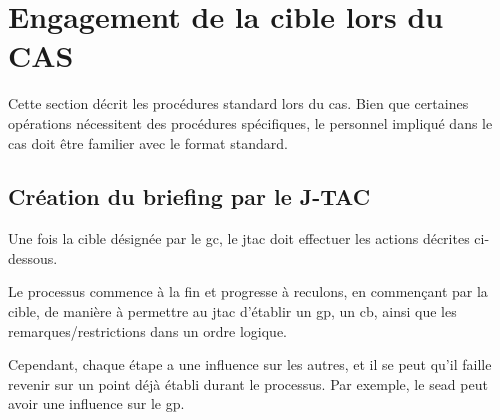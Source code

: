 \section{Engagement de la cible lors du CAS}

Cette section décrit les procédures standard lors du \gls{cas}. Bien que certaines opérations nécessitent des procédures spécifiques, le personnel impliqué dans le \gls{cas} doit être familier avec le format standard.

\subsection{Création du briefing par le J-TAC}
Une fois la cible désignée par le \gls{gc}, le \gls{jtac} doit effectuer les actions décrites ci-dessous.

Le processus commence à la fin et progresse à reculons, en commençant par la cible, de manière à permettre au \gls{jtac} d'établir un \gls{gp}, un \gls{cb}, ainsi que les remarques/restrictions dans un ordre logique.

Cependant, chaque étape a une influence sur les autres, et il se peut qu'il faille revenir sur un point déjà établi durant le processus. Par exemple, le \gls{sead} peut avoir une influence sur le \gls{gp}.

